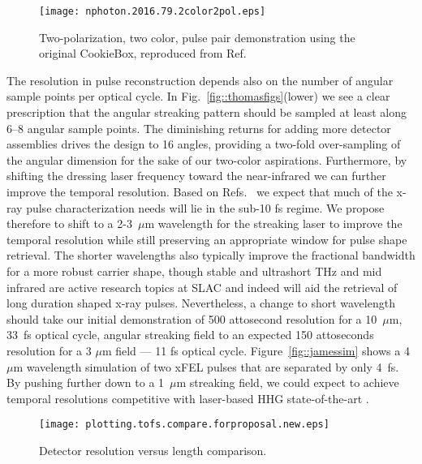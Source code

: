 \begin{wrapfigure}[17]{l}{3in}
\centerline{\texttt{[image: nphoton.2016.79.2color2pol.eps]}}
\caption{\label{fig::2color2polResults}Two-polarization, two color, pulse pair demonstration using the original CookieBox, reproduced from Ref.~\cite{Lutman2016}}
\end{wrapfigure}
The resolution in pulse reconstruction depends also on the number of angular sample points per optical cycle.
In Fig.~\ref{fig::thomasfigs}(lower) we see a clear prescription that the angular streaking pattern should be sampled at least along 6--8 angular sample points.
The diminishing returns for adding more detector assemblies drives the design to 16 angles, providing a two-fold over-sampling of the angular dimension for the sake of our two-color aspirations.
Furthermore, by shifting the dressing laser frequency toward the near-infrared we can further improve the temporal resolution.
Based on Refs.~\cite{lcls2_opportunities,Cederbaum2008,Biggs2012,Mukamel2013} we expect that much of the x-ray pulse characterization needs will lie in the sub-10 fs regime.
We propose therefore to shift to a 2-3~$\mu$m wavelength for the streaking laser to improve the temporal resolution while still preserving an appropriate window for pulse shape retrieval.
The shorter wavelengths also typically improve the fractional bandwidth for a more robust carrier shape, though stable and ultrashort THz \cite{Matthias2008,MatthiasReview2011,Hauri2011} and mid infrared \cite{Sell2008,Cavalleri2010} are active research topics at SLAC and indeed will aid the retrieval of long duration shaped x-ray pulses. 
Nevertheless, a change to short wavelength should take our initial demonstration of 500 attosecond resolution for a 10~$\mu$m, 33~fs optical cycle, angular streaking field to an expected 150 attoseconds resolution for a 3 $\mu$m field --- 11 fs optical cycle.
Figure~\ref{fig::jamessim} shows a 4~$\mu$m wavelength simulation of two xFEL pulses that are separated by only 4~fs.
By pushing further down to a 1~$\mu$m streaking field, we could expect to achieve temporal resolutions competitive with laser-based HHG state-of-the-art \cite{Zenghu2017,HJWorner2017}.

\begin{wrapfigure}[16]{r}{3.5in}
\vspace{-1.5\baselineskip}
\centerline{\texttt{[image: plotting.tofs.compare.forproposal.new.eps]}}
\vspace{-0.5\baselineskip}
\caption{\label{fig::detectorcompare}Detector resolution versus length comparison. }
\end{wrapfigure}

